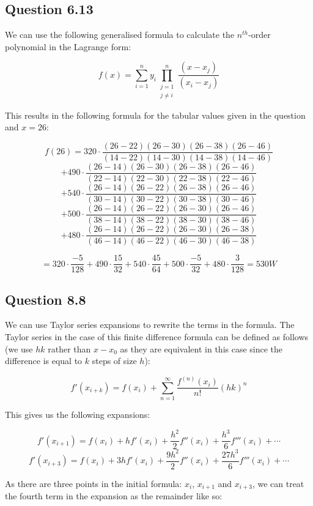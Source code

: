 \documentclass[12pt]{article}
\begin{document}
\subsection*{Question 6.13}

\noindent We can use the following generalised formula to calculate the $n^{th}$-order polynomial in the Lagrange form:

$$f(x) = \sum_{i = 1}^n y_i \prod_{\substack{j = 1 \\ j \neq i}}^n \frac{(x - x_j)}{(x_i - x_j)}$$

\indent This results in the following formula for the tabular values given in the question and $x = 26$:

$$f(26) = 320 \cdot \frac{(26 - 22)(26- 30)(26 - 38)(26 - 46)}{(14 - 22)(14 - 30)(14 - 38)(14 - 46)} $$
$$ + 490 \cdot \frac{(26 - 14)(26- 30)(26 - 38)(26 - 46)}{(22 - 14)(22 - 30)(22 - 38)(22 - 46)} $$
$$ + 540 \cdot \frac{(26 - 14)(26- 22)(26 - 38)(26 - 46)}{(30 - 14)(30 - 22)(30 - 38)(30 - 46)} $$
$$ + 500 \cdot \frac{(26 - 14)(26- 22)(26 - 30)(26 - 46)}{(38 - 14)(38 - 22)(38 - 30)(38 - 46)} $$
$$ + 480 \cdot \frac{(26 - 14)(26- 22)(26 - 30)(26 - 38)}{(46 - 14)(46 - 22)(46 - 30)(46 - 38)} $$

$$ = 320 \cdot \frac{-5}{128} + 490 \cdot \frac{15}{32} + 540 \cdot \frac{45}{64} + 500 \cdot \frac{-5}{32} + 480 \cdot \frac{3}{128} = 530W$$

\subsection*{Question 8.8}

\noindent We can use Taylor series expansions to rewrite the terms in the formula. The Taylor series in the case of this finite difference formula can be defined as follows (we use $hk$ rather than $x - x_0$ as they are equivalent in this case since the difference is equal to $k$ steps of size $h$):

$$ f'(x_{i + k}) = f(x_i) + \sum_{n = 1}^{\infty} \frac{f^{(n)}(x_i)}{n!}(hk)^n $$

\indent This gives us the following expansions:

$$ f'(x_{i + 1}) = f(x_i) + h f'(x_i) + \frac{h^2}{2} f''(x_i) + \frac{h^3}{6} f'''(x_i) + \cdots $$
$$ f'(x_{i + 3}) = f(x_i) + 3h f'(x_i) + \frac{9 h^2}{2} f''(x_i) + \frac{27 h^3}{6} f'''(x_i) + \cdots $$

\indent As there are three points in the initial formula: $x_i$, $x_{i + 1}$ and $x_{i + 3}$, we can treat the fourth term in the expansion as the remainder like so:
\end{document}
